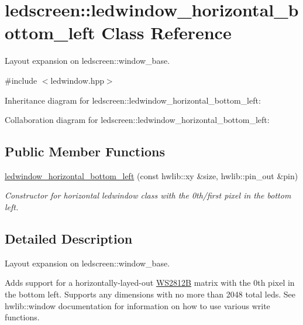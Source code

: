 \hypertarget{classledscreen_1_1ledwindow__horizontal__bottom__left}{}\section{ledscreen\+:\+:ledwindow\+\_\+horizontal\+\_\+bottom\+\_\+left Class Reference}
\label{classledscreen_1_1ledwindow__horizontal__bottom__left}


Layout expansion on ledscreen\+::window\+\_\+base.  




{\ttfamily \#include $<$ledwindow.\+hpp$>$}



Inheritance diagram for ledscreen\+:\+:ledwindow\+\_\+horizontal\+\_\+bottom\+\_\+left\+:


Collaboration diagram for ledscreen\+:\+:ledwindow\+\_\+horizontal\+\_\+bottom\+\_\+left\+:
\subsection*{Public Member Functions}
\begin{DoxyCompactItemize}
\item 
\hyperlink{classledscreen_1_1ledwindow__horizontal__bottom__left_a08b0b9816b21372ccda9f1dc6b45cf90}{ledwindow\+\_\+horizontal\+\_\+bottom\+\_\+left} (const hwlib\+::xy \&size, hwlib\+::pin\+\_\+out \&pin)
\begin{DoxyCompactList}\small\item\em Constructor for horizontal ledwindow class with the 0th/first pixel in the bottom left. \end{DoxyCompactList}\end{DoxyCompactItemize}


\subsection{Detailed Description}
Layout expansion on ledscreen\+::window\+\_\+base. 

Adds support for a horizontally-\/layed-\/out \hyperlink{classledscreen_1_1WS2812B}{W\+S2812B} matrix with the 0th pixel in the bottom left. Supports any dimensions with no more than 2048 total leds. See hwlib\+::window documentation for information on how to use various write functions. 

